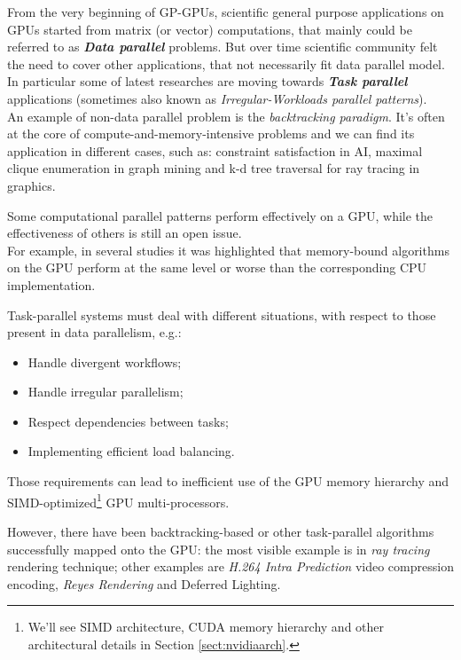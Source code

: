 	From the very beginning of GP-GPUs, scientific general purpose applications on GPUs started from matrix (or vector) computations, that mainly could be referred to as \textbf{\textit{Data parallel}} problems.
	But over time scientific community felt the need to cover other applications, that not necessarily fit data parallel model.\\	
	In particular some of latest researches are moving towards \textbf{\textit{Task parallel}} applications (sometimes also known as \textit{Irregular-Workloads parallel patterns})\cite{backtrack}.\\
	
	An example of non-data parallel problem is the \textit{backtracking paradigm}.
	It's often at the core of compute-and-memory-intensive problems and we can find its application in different cases, such as: constraint satisfaction in AI, maximal clique enumeration in graph mining and k-d tree traversal for ray tracing in graphics.
	
	Some computational parallel patterns perform effectively on a GPU, while the effectiveness of others is still an open issue.\\
	For example, in several studies it was highlighted that memory-bound algorithms on the GPU perform at the same level or worse than the corresponding CPU implementation. 
	
	Task-parallel systems must deal with different situations, with respect to those present in data parallelism, e.g.:
	\begin{itemize}
		\item Handle divergent workflows;
		\item Handle irregular parallelism;
		\item Respect dependencies between tasks;
		\item Implementing efficient load balancing.
	\end{itemize}
	
	Those requirements can lead to inefficient use of the GPU memory hierarchy and SIMD-optimized\footnote{We'll see SIMD architecture, CUDA memory hierarchy and other architectural details in Section \ref{sect:nvidiaarch}.} GPU multi-processors.
	
	However, there have been backtracking-based or other task-parallel algorithms successfully mapped onto the GPU: the most visible example is in \textit{ray tracing} rendering technique; other examples are \textit{H.264 Intra Prediction} video compression encoding, \textit{Reyes Rendering} and Deferred Lighting.
		
